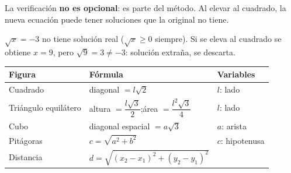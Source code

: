 \documentclass[11pt, letterpaper]{article}
\begin{document}
\begin{tcolorbox}[warningbox, title={Soluciones extrañas}]
La verificación \textbf{no es opcional}: es parte del método. Al elevar al cuadrado, la nueva ecuación puede tener soluciones que la original no tiene.

$\sqrt{x}=-3$ no tiene solución real ($\sqrt{x}\geq 0$ siempre). Si se eleva al cuadrado se obtiene $x=9$, pero $\sqrt{9}=3\neq -3$: solución extraña, se descarta.
\end{tcolorbox}

\begin{tcolorbox}[importantbox, title={Fórmulas geométricas con raíces}]
\begin{center}
\renewcommand{\arraystretch}{1.4}
\begin{tabular}{l|l|l}
\toprule
\textbf{Figura} & \textbf{Fórmula} & \textbf{Variables}\\
\midrule
Cuadrado & diagonal $=l\sqrt{2}$ & $l$: lado\\
Triángulo equilátero & altura $=\dfrac{l\sqrt{3}}{2}$;\quad área $=\dfrac{l^2\sqrt{3}}{4}$ & $l$: lado\\
Cubo & diagonal espacial $=a\sqrt{3}$ & $a$: arista\\
Pitágoras & $c=\sqrt{a^2+b^2}$ & $c$: hipotenusa\\
Distancia & $d=\sqrt{(x_2-x_1)^2+(y_2-y_1)^2}$ &\\
\bottomrule
\end{tabular}
\end{center}
\end{tcolorbox}
\clearpage
\end{document}
